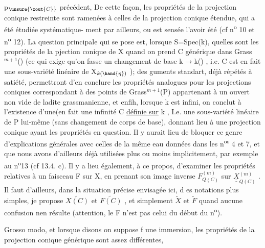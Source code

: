 
p$_{\unsure{\xout{C}}}$ précédent, 
 De cette façon, les propriétés de
la projection conique  restreinte  sont ramenées  à
celles de la projection conique étendue, qui a été  étudiée systématique-%
ment par ailleurs, ou est sensée l'avoir été (cf n\textsuperscript{o} 10 et n\textsuperscript{o} 12). La
question principale qui se pose est, lorsque  S=Spec(k), quelles sont
les propriétés de la pjection conique  de X  quand on prend C générique
dans Grass$^{m+1}$() (ce qui exige  qu'on fasse un changement de base
k$\rightarrow$k() , i.e.  C est  en fait une sous-variété linéaire de X$_{k(\hand{\eta})}$ ); des
guments  standart, déjà répétés à satiété, permettront d'en conclure
les propriétés analogues pour les projections coniques correspondant à 
des points de Grass$^{m+1}$(P)  appartenant à un ouvert non vide de ladite
grassmanienne, et enfih, lorsque k est infini, on conclut à l'existence
d'une(en fait une infinité\hand{)}   C  \uline{définie sur} k , I.e.  une sous-variété
linéaire de P lui-même (sans changement de corps de base), donnant lieu
à une projection conique ayant les propriétés en question. Il y aurait
\margin{|} lieu de bloquer ce genre d'explications générales avec celles de la même
\margin{|} eau données dans les n\textsuperscript{os} 4 et 7, et que nous avons d'ailleurs déjà
\margin{|} utilisées plus ou moins implicitement,  par exemple au n\textsuperscript{o}13 
 (cf 13.4. c). Il y a lieu également, à ce propos, d'examiner les
propriétés relatives à un faisceau F sur X,  en prenant son image inverse
$F^{(m)}_{Q(C)}$  sur  $\underline{\underline{X}}^{(m)}_{Q(C)}$ . Il faut  d'ailleurs, dans la situation précise
envisagée ici, d es notations plus simples, je propose  $\widetilde{X(C)}$ et $\widetilde{F(C)}$ ,
et simplement $\widetilde{X}$ et $\widetilde{F}$  quand aucune confusion nen résulte  (attention, le
F   n'est pas  celui du début du n\textsuperscript{o}).

Grosso modo, et lorsque  disons on suppose  f une immersion, les
propriétés de la projection conique générique sont assez différentes,

